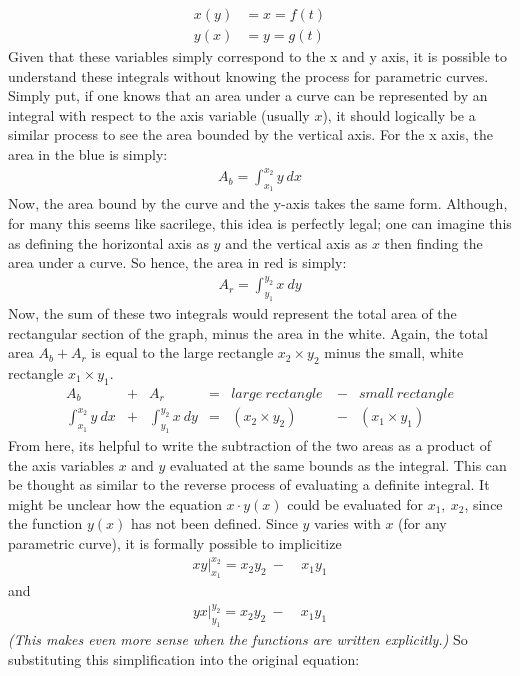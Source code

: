 \documentclass[11pt,a4paper]{article}
\begin{document}
\begin{align*}
x(y) &= x = f(t)\\
y(x) &= y = g(t)
\end{align*}
Given that these variables simply correspond to the x and y axis, it is possible to understand these integrals without knowing the process for parametric curves. Simply put, if one knows that an area under a curve can be represented by an integral with respect to the axis variable (usually $x$), it should logically be a similar process to see the area bounded by the vertical axis.  For the x axis, the area in the blue is simply:
\begin{align*}
A_b = \int_{x_1}^{x_2} y\ dx
\end{align*}
Now, the area bound by the curve and the y-axis takes the same form.  Although, for many this seems like sacrilege, this idea is perfectly legal; one can imagine this as defining the horizontal axis as $y$ and the vertical axis as $x$ then finding the area under a curve.  So hence, the area in red is simply:
\begin{align*}
A_r = \int_{y_1}^{y_2} x \ dy
\end{align*}
Now, the sum of these two integrals would represent the total area of the rectangular section of the graph,  minus the area in the white. Again,  the total area $A_b + A_r$ is equal to the large rectangle $x_2 \times y_2$ minus the small, white rectangle $x_1 \times y_1$.
\begin{align*}
A_b &+ &A_r &= &large\ rectangle\ &- &small\ rectangle \\
\int_{x_1}^{x_2} y \ dx &+ &\int_{y_1}^{y_2} x \ dy &= &( x_2 \times y_2)\ \ & - &(x_1 \times y_1)
\end{align*}
From here, its helpful to write the subtraction of the two areas as a product of the axis variables $x$ and $y$ evaluated at the same bounds as the integral. This can be thought as similar to the reverse process of evaluating a definite integral. It might be unclear how the equation $x \cdot y(x)$ could be evaluated for $x_1 ,\ x_2$, since the function $y(x)$ has not been defined. Since $y$ varies with $x$ (for any parametric curve), it is formally possible to implicitize 
\begin{align*}
xy \Big|_{x_1}^{x_2} =  x_2 y_2\ -\ & x_1 y_1
\end{align*}
and
\begin{align*}
yx \Big|_{y_1}^{y_2} =  x_2 y_2\ -\ & x_1 y_1
\end{align*}
\textit{(This makes even more sense when the functions are written explicitly.)} So substituting this simplification into the original equation:
\end{document}
